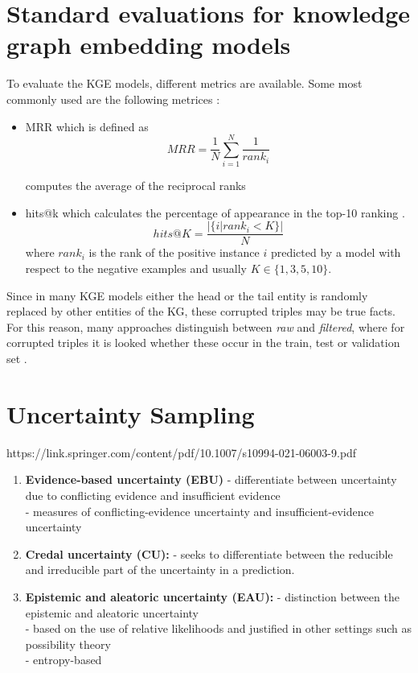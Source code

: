 \section{Standard evaluations for knowledge graph embedding models} 
To evaluate the \ac{KGE} models, different metrics are available.
Some most commonly used are the following metrices \cite{kotnis2017analysis}:
\begin{itemize}
    \item 
    \ac{MRR} which is defined as
    \begin{equation}
        MRR = \frac{1}{N} \sum_{i=1}^{N}\frac{1}{rank_i}
    \end{equation}
    
    computes the average of the reciprocal ranks \cite{zhang2021efficient}
    
    \item 
    hits@k which calculates the percentage of appearance in the top-10 ranking \cite{zhang2021efficient}.
    \begin{equation}
        hits@K = \frac{|\{i | rank_i < K\}|}{N}
    \end{equation}
    where $rank_i$ is the rank of the positive instance $i$ predicted by a model with respect to the negative examples and usually $K \in \{1, 3, 5, 10\}$.
\end{itemize}
Since in many \ac{KGE} models either the head or the tail entity is randomly replaced by other entities of the KG, these corrupted triples may be true facts.
For this reason, many approaches distinguish between \textit{raw} and \textit{filtered}, where for corrupted triples it is looked whether these occur in the train, test or validation set \cite{TransE}.

\section{Uncertainty Sampling}
https://link.springer.com/content/pdf/10.1007/s10994-021-06003-9.pdf

\begin{enumerate}
    \item 
    \textbf{Evidence-based uncertainty (EBU)}
    - differentiate between uncertainty due to conflicting evidence and insufficient evidence\\
    - measures of conflicting-evidence uncertainty and insufficient-evidence uncertainty
    
    \item 
    \textbf{Credal uncertainty (CU):}
    - seeks to differentiate between the reducible and irreducible part of the uncertainty in a prediction.
    
    \item 
    \textbf{Epistemic and aleatoric uncertainty (EAU):}
    - distinction between the epistemic and aleatoric uncertainty\\
    -  based on the use of relative likelihoods and justified in other settings such as possibility theory\\
    - entropy-based
\end{enumerate}

